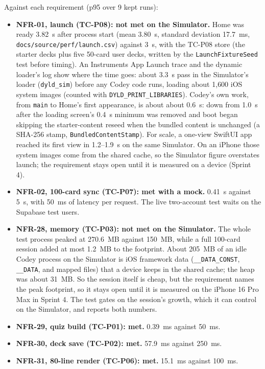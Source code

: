 \documentclass[12pt,letterpaper]{article}
\begin{document}
Against each requirement (p95 over 9 kept runs):
\begin{itemize}
  \item \textbf{NFR-01, launch (TC-P08): not met on the Simulator.} Home was ready
        3.82~s after process start (mean 3.80~s, standard deviation 17.7~ms,
        \texttt{docs/source/perf/launch.csv}) against
        3~s, with the TC-P08 store (the starter decks plus five 50-card user decks,
        written by the \texttt{LaunchFixtureSeed} test before timing). An Instruments App Launch trace and the
        dynamic loader's log show where the time goes: about 3.3~s pass in the
        Simulator's loader (\texttt{dyld\_sim}) before any Codey code runs, loading
        about 1{,}600 iOS system images (counted with \texttt{DYLD\_PRINT\_LIBRARIES}).
        Codey's own work, from \texttt{main} to Home's first appearance, is about
        about 0.6~s: down from 1.0~s after the loading screen's 0.4~s minimum was
        removed and boot began skipping the starter-content reseed when the bundled
        content is unchanged (a SHA-256 stamp, \texttt{BundledContentStamp}). For scale,
        a one-view SwiftUI app reached its first view in 1.2--1.9~s on the same
        Simulator. On an iPhone those system images come from the shared cache, so
        the Simulator figure overstates launch; the requirement stays open until it
        is measured on a device (Sprint 4).
  \item \textbf{NFR-02, 100-card sync (TC-P07): met with a mock.} 0.41~s against
        5~s, with 50~ms of latency per request. The live two-account test waits on
        the Supabase test users.
  \item \textbf{NFR-28, memory (TC-P03): not met on the Simulator.} The whole test
        process peaked at 270.6~MB against 150~MB, while a full 100-card session
        added at most 1.2~MB to the footprint. About 205~MB of an idle Codey process on the
        Simulator is iOS framework data (\texttt{\_\_DATA\_CONST}, \texttt{\_\_DATA}, and
        mapped files) that a device keeps in the shared cache; the heap was about
        31~MB. So the session itself is cheap, but the requirement names the peak
        footprint, so it stays open until it is measured on the iPhone 16 Pro Max in
        Sprint 4. The test gates on the session's growth, which it can control on the
        Simulator, and reports both numbers.
  \item \textbf{NFR-29, quiz build (TC-P01): met.} 0.39~ms against 50~ms.
  \item \textbf{NFR-30, deck save (TC-P02): met.} 57.9~ms against 250~ms.
  \item \textbf{NFR-31, 80-line render (TC-P06): met.} 15.1~ms against 100~ms.
\end{itemize}
\end{document}
